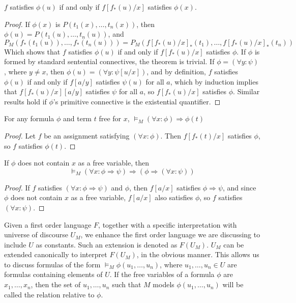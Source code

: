 \begin{lemma}
    $f$ satisfies $\phi(u)$ if and only if $f[f_*(u)/x]$ satisfies $\phi(x)$.
\end{lemma}
\begin{proof}
    If $\phi(x)$ is $P(t_1(x), \dots, t_n(x))$, then $\phi(u) = P(t_1(u), \dots, t_n(u))$, and
    \[ P_M(f_*(t_1(u)), \dots, f_*(t_n(u))) = P_M(f[f_*(u)/x]_*(t_1), \dots, f[f_*(u)/x]_*(t_n)) \]
    Which shows that $f$ satisfies $\phi(u)$ if and only if $f[f_*(u)/x]$ satisfies $\phi$. If $\phi$ is formed by standard sentential connectives, the theorem is trivial. If $\phi = (\forall y: \psi)$, where $y \neq x$, then $\phi(u) = (\forall y: \psi[u/x])$, and by definition, $f$ satisfies $\phi(u)$ if and only if $f[a/y]$ satisfies $\psi(u)$ for all $a$, which by induction implies that $f[f_*(u)/x][a/y]$ satisfies $\psi$ for all $a$, so $f[f_*(u)/x]$ satisfies $\phi$. Similar results hold if $\phi$'s primitive connective is the existential quantifier.
\end{proof}

\begin{theorem}
    For any formula $\phi$ and term $t$ free for $x$, $\vDash_M (\forall x : \phi) \Rightarrow \phi(t)$
\end{theorem}
\begin{proof}
    Let $f$ be an assignment satisfying $(\forall x: \phi)$. Then $f[f_*(t)/x]$ satisfies $\phi$, so $f$ satisfies $\phi(t)$.
\end{proof}

\begin{theorem}
    If $\phi$ does not contain $x$ as a free variable, then
    \[ \vDash_M (\forall x: \phi \Rightarrow \psi) \Rightarrow (\phi \Rightarrow (\forall x: \psi)) \]
\end{theorem}
\begin{proof}
    If $f$ satisfies $(\forall x: \phi \Rightarrow \psi)$ and $\phi$, then $f[a/x]$ satisfies $\phi \Rightarrow \psi$, and since $\phi$ does not contain $x$ as a free variable, $f[a/x]$ also satisfies $\phi$, so $f$ satisfies $(\forall x : \psi)$.
\end{proof}

Given a first order language $F$, together with a specific interpretation with universe of discourse $U_M$, we enhance the first order language we are discussing to include $U$ as constants. Such an extension is denoted as $F(U_M)$. $U_M$ can be extended canonically to interpret $F(U_M)$, in the obvious manner. This allows us to discuss formulas of the form $\vDash_M \phi(u_1, \dots, u_n)$, where $u_1, \dots, u_n \in U$ are formulas containing elements of $U$. If the free variables of a formula $\phi$ are $x_1, \dots, x_n$, then the set of $u_1, \dots, u_n$ such that $M$ models $\phi(u_1, \dots, u_n)$ will be called the relation relative to $\phi$.

